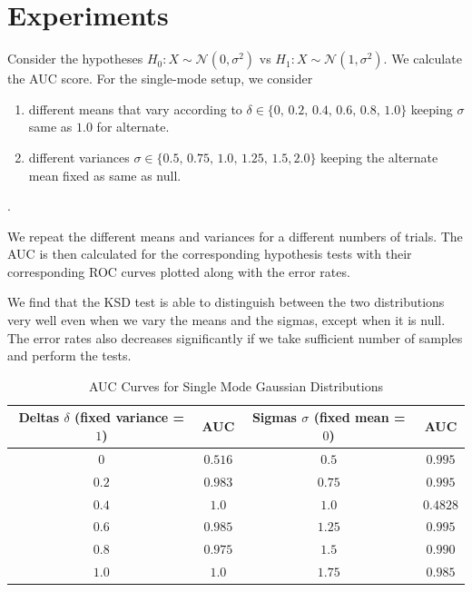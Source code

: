 \documentclass[12pt,a4paper]{report}
\begin{document}
\section{Experiments}
Consider the hypotheses $H_0:X\sim\mathcal{N}(0,\sigma^2)$ vs $H_1:X\sim\mathcal{N}(1,\sigma^2)$. We calculate the AUC score. For the single-mode setup, we consider 
\begin{enumerate}
    \item different means that vary according to $\delta \in \{0,\,0.2,\,0.4,\,0.6,\,0.8,\,1.0\}$ keeping $\sigma$ same as $1.0$ for alternate.
    \item different variances $\sigma \in \{0.5,\,0.75,\, 1.0,\, 1.25,\, 1.5, 2.0\}$ keeping the alternate mean fixed as same as null.
\end{enumerate}.

\vspace{0.3cm}
\noindent
We repeat the different means and variances for a different numbers of trials. The AUC is then calculated for the corresponding hypothesis tests with their corresponding ROC curves plotted along with the error rates.

\vspace{0.3cm}
\noindent
We find that the KSD test is able to distinguish between the two distributions very well even when we vary the means and the sigmas, except when it is null. The error rates also decreases significantly if we take sufficient number of samples and perform the tests.

\begin{table}[ht]
    \centering
    \caption{AUC Curves for Single Mode Gaussian Distributions}
    \label{tab:normalized_mse}
    
    \begin{tabular}{c|c|c|c}
        \hline
        Deltas $\delta$ (fixed variance = $1$) & AUC & Sigmas  $\sigma$ (fixed mean = $0$) & AUC \\
        \hline
        $0$  & $0.516$ & $0.5$ & $0.995$ \\ 
        $0.2$  & $0.983$ & $0.75$ & $0.995$ \\
        $0.4$  & $1.0$ & $1.0$ & $0.4828$ \\
        $0.6$  & $0.985$ & $1.25$ & $0.995$ \\
        $0.8$  & $0.975$ & $1.5$ & $0.990$ \\
        $1.0$  & $1.0$ & $1.75$ & $0.985$ \\
        \hline
    \end{tabular}
\end{table}
\end{document}
